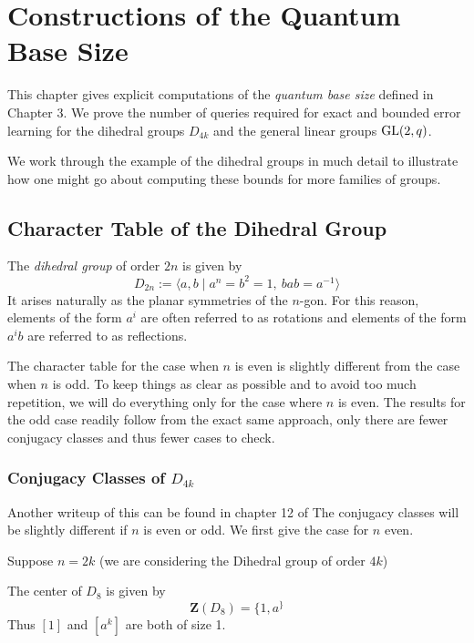 

\chapter{Constructions of the Quantum Base Size}

This chapter gives explicit computations of the \emph{quantum base size} defined in Chapter 3. We prove the number 
of queries required for exact and bounded error learning for the dihedral groups $D_{4k}$ and the general linear 
groups $\operatorname{GL}(2, q)$.

We work through the example of the dihedral groups in much detail to illustrate how one might go about computing 
these bounds for more families of groups.





\section{Character Table of the Dihedral Group}

The \emph{dihedral group} of order $2n$ is given by
\[
    D_{2n} := \langle a,b \mid a^n = b^2 = 1,\ bab = a^{-1} \rangle
\]
It arises naturally as the planar symmetries of the $n$-gon. For this reason, elements of the form $a^i$ are often 
referred to as rotations and elements of the form $a^ib$ are referred to as reflections.

The character table for the case when $n$ is even is slightly different from the case when $n$ is odd. To keep 
things as clear as possible and to avoid too much repetition, we will do everything only for the case where $n$ is 
even. The results for the odd case readily follow from the exact same approach, only there are fewer conjugacy 
classes and thus fewer cases to check.

\subsection{Conjugacy Classes of $D_{4k}$}

Another writeup of this can be found in chapter 12 of \cite{James&Liebeck}
The conjugacy classes will be slightly different if $n$ is even or odd. We first give the case for $n$ even. 

Suppose $n = 2k$ (we are considering the Dihedral group of order $4k$)

The center of $D_8$ is given by
\[
    \mathbf{Z}(D_8) = \{1, a^\}
\]
Thus $[1]$ and $[a^k]$ are both of size 1.


